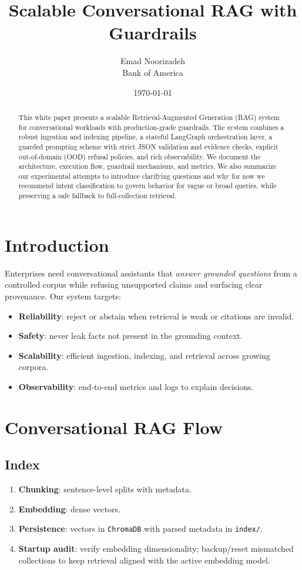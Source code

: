 \documentclass[11pt]{article}
\title{Scalable Conversational RAG with Guardrails}
\author{Emad Noorizadeh \\ Bank of America}
\date{\today}
\begin{document}
\maketitle

\begin{abstract}
This white paper presents a scalable Retrieval-Augmented Generation (RAG) system for conversational workloads with production-grade guardrails. The system combines a robust ingestion and indexing pipeline, a stateful LangGraph orchestration layer, a guarded prompting scheme with strict JSON validation and evidence checks, explicit out-of-domain (OOD) refusal policies, and rich observability. We document the architecture, execution flow, guardrail mechanisms, and metrics. We also summarize our experimental attempts to introduce clarifying questions and why for now we recommend intent classification to govern behavior for vague or broad queries, while preserving a safe fallback to full-collection retrieval.
\end{abstract}


\section{Introduction}
Enterprises need conversational assistants that \emph{answer grounded questions} from a controlled corpus while refusing unsupported claims and surfacing clear provenance. Our system targets:
\begin{itemize}[leftmargin=1.25em]
  \item \textbf{Reliability}: reject or abstain when retrieval is weak or citations are invalid.
  \item \textbf{Safety}: never leak facts not present in the grounding context.
  \item \textbf{Scalability}: efficient ingestion, indexing, and retrieval across growing corpora.
  \item \textbf{Observability}: end-to-end metrics and logs to explain decisions.
\end{itemize}

\section{Conversational RAG Flow}
\subsection{Index}
\begin{enumerate}[leftmargin=1.25em]
  \item \textbf{Chunking}: sentence-level splits with metadata.
  \item \textbf{Embedding}: dense vectors.
  \item \textbf{Persistence}: vectors in \texttt{ChromaDB} with parsed metadata in \texttt{index/}.
  \item \textbf{Startup audit}: verify embedding dimensionality; backup/reset mismatched collections to keep retrieval aligned with the active embedding model.
\end{enumerate}
\end{document}
